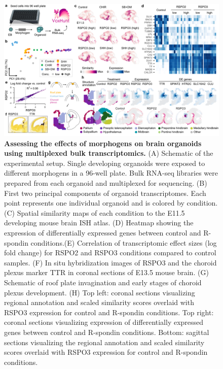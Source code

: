 \begin{figure}[t!]
    \centering
	\includegraphics[width=\textwidth]{figures/voxhunt/Figure_7}
    \caption{\textbf{Assessing the effects of morphogens on brain organoids using multiplexed bulk transcriptomics.} (A) Schematic of the experimental setup. Single developing organoids were exposed to different morphogens in a 96-well plate. Bulk RNA-seq libraries were prepared from each organoid and multiplexed for sequencing. (B) First two principal components of organoid transcriptomes. Each point represents one individual organoid and is colored by condition. (C) Spatial similarity maps of each condition to the E11.5 developing mouse brain ISH atlas. (D) Heatmap showing the expression of differentially expressed genes between control and R-spondin conditions.(E) Correlation of transcriptomic effect sizes (log fold change) for RSPO2 and RSPO3 conditions compared to control samples. (F) In situ hybridization images of RSPO3 and the choroid plexus marker TTR in coronal sections of E13.5 mouse brain. (G) Schematic of roof plate invagination and early stages of choroid plexus development. (H) Top left: coronal sections visualizing regional annotation and scaled similarity scores overlaid with RSPO3 expression for control and R-spondin conditions. Top right: coronal sections visualizing expression of differentially expressed genes between control and R-spondin conditions. Bottom: sagittal sections visualizing the regional annotation and scaled similarity scores overlaid with RSPO3 expression for control and R-spondin conditions.}
    \label{fig:vox7}
\end{figure}



